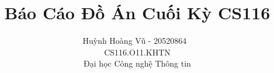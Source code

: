 %
%






\documentclass[journal]{IEEEtran}

\usepackage{xcolor,soul,framed} %

\usepackage[pdftex]{graphicx}
\usepackage[]{algorithm2e}
\graphicspath{{../pdf/}{../jpeg/}}
\usepackage[cmex10]{amsmath}
\usepackage{array}
\usepackage{mdwmath}
\usepackage{mdwtab}
\usepackage{eqparbox}
\usepackage{url}

\usepackage{amssymb, amsfonts}
\usepackage[utf8]{vietnam}





    \title {Báo Cáo Đồ Án Cuối Kỳ CS116}
  \author{Huỳnh Hoàng Vũ - 20520864\,~\IEEEmembership{}\\
    CS116.O11.KHTN\\
      Đại học Công nghệ Thông tin\\%
      }



\maketitle




